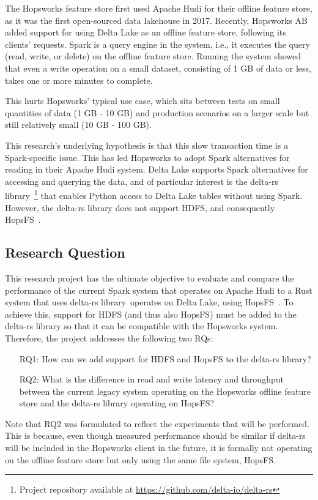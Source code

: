 The Hopsworks feature store \cite{10.1145/3626246.3653389} first used Apache Hudi for their offline feature store, as it was the first open-sourced data lakehouse in 2017. Recently, Hopsworks \gls{AB} added support for using Delta Lake as an offline feature store, following its clients' requests. Spark is a query engine in the system, i.e., it executes the query (read, write, or delete) on the offline feature store. Running the system showed that even a write operation on a small dataset, consisting of 1 GB of data or less, takes one or more minutes to complete.

This hurts Hopsworks' typical use case, which sits between tests on small quantities of data (1 GB - 10 GB) and production scenarios on a larger scale but still relatively small (10 GB - 100 GB).

This research's underlying hypothesis is that this slow transaction time is a Spark-specific issue. This has led Hopsworks to adopt Spark alternatives \cite{Khazanchi1801362} for reading in their Apache Hudi system. Delta Lake supports Spark alternatives for accessing and querying the data, and of particular interest is the delta-rs library~\footnote{Project repository available at \url{https://github.com/delta-io/delta-rs}} that enables Python access to Delta Lake tables without using Spark. 
However, the delta-rs library does not support \gls{HDFS}, and consequently \gls{HopsFS}~\cite{niaziHopsFSScalingHierarchical2017}.

\subsection{Research Question}
\label{subsec:researchQuestion}
This research project has the ultimate objective to evaluate and compare the performance of the current Spark system that operates on Apache Hudi to a Rust system that uses delta-rs library~\footnotemark[\value{footnote}] operates on Delta Lake, using \gls{HopsFS}~\cite{niaziHopsFSScalingHierarchical2017}. To achieve this, support for \gls{HDFS} (and thus also \gls{HopsFS}) must be added to the delta-rs library so that it can be compatible with the Hopsworks system. Therefore, the project addresses the following two \glspl{RQ}:
\begin{enumerate}
    \item[RQ1:] How can we add support for \gls{HDFS} and \gls{HopsFS} to the delta-rs library?
    \item[RQ2:] What is the difference in read and write latency and throughput between the current legacy system operating on the Hopsworks offline feature store and the delta-rs library operating on HopsFS?
\end{enumerate}
Note that RQ2 was formulated to reflect the experiments that will be performed. This is because, even though measured performance should be similar if delta-rs will be included in the Hopsworks client in the future, it is formally not operating on the offline feature store but only using the same file system, \gls{HopsFS}.

